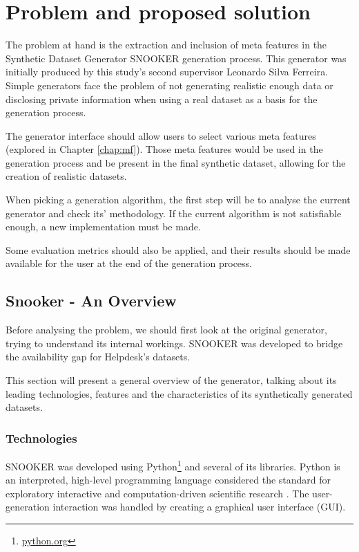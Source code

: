 \chapter{Problem and proposed solution} \label{chap:Problem}
The problem at hand is the extraction and inclusion of meta features in the Synthetic Dataset Generator SNOOKER generation process. This generator was initially produced by this study's second supervisor Leonardo Silva Ferreira. Simple generators face the problem of not generating realistic enough data or disclosing private information \citep{disclosure} when using a real dataset as a basis for the generation process.

The generator interface should allow users to select various meta features (explored in Chapter \ref{chap:mf}). Those meta features would be used in the generation process and be present in the final synthetic dataset, allowing for the creation of realistic datasets. 

When picking a generation algorithm, the first step will be to analyse the current generator and check its' methodology. If the current algorithm is not satisfiable enough, a new implementation must be made.

Some evaluation metrics should also be applied, and their results should be made available for the user at the end of the generation process.

\section{Snooker - An Overview}
\label{chap:Snooker}
Before analysing the problem, we should first look at the original generator, trying to understand its internal workings. SNOOKER was developed to bridge the availability gap for Helpdesk's datasets.

This section will present a general overview of the generator, talking about its leading technologies, features and the characteristics of its synthetically generated datasets.

\subsection{Technologies}

SNOOKER was developed using Python\footnote{\href{https://www.python.org/}{python.org}} and several of its libraries. Python is an interpreted, high-level programming language considered the standard for exploratory interactive and computation-driven scientific research \citep{5725235}. The user-generation interaction was handled by creating a graphical user interface (GUI).

